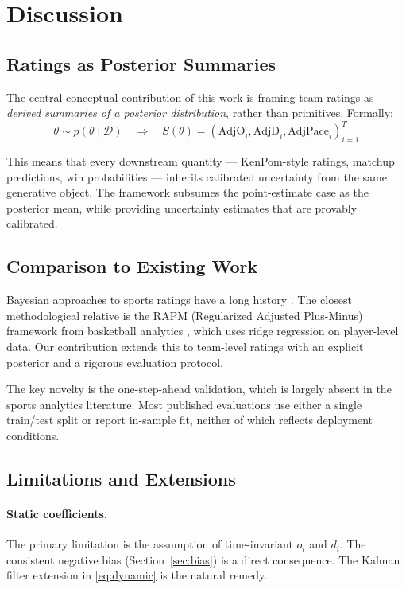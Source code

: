 \documentclass[11pt]{article}
\begin{document}
\section{Discussion}

\subsection{Ratings as Posterior Summaries}

The central conceptual contribution of this work is framing team ratings as
\emph{derived summaries of a posterior distribution}, rather than primitives.
Formally:
\begin{equation}
  \theta \sim p(\theta \mid \mathcal{D})
  \quad\Longrightarrow\quad
  S(\theta) = (\text{AdjO}_i, \text{AdjD}_i, \text{AdjPace}_i)_{i=1}^T
\end{equation}

This means that every downstream quantity --- KenPom-style ratings, matchup
predictions, win probabilities --- inherits calibrated uncertainty from the same
generative object.  The framework subsumes the point-estimate case as the
posterior mean, while providing uncertainty estimates that are provably
calibrated.

\subsection{Comparison to Existing Work}

Bayesian approaches to sports ratings have a long history
\citep{glickman1999,kovalchik2016}.  The closest methodological relative is the
RAPM (Regularized Adjusted Plus-Minus) framework from basketball analytics
\citep{sill2010}, which uses ridge regression on player-level data.  Our
contribution extends this to team-level ratings with an explicit posterior and
a rigorous evaluation protocol.

The key novelty is the one-step-ahead validation, which is largely absent in
the sports analytics literature.  Most published evaluations use either a
single train/test split or report in-sample fit, neither of which reflects
deployment conditions.

\subsection{Limitations and Extensions}

\paragraph{Static coefficients.}  The primary limitation is the assumption of
time-invariant $o_i$ and $d_i$.  The consistent negative bias (Section~\ref{sec:bias}) is a direct consequence.  The Kalman filter extension in \eqref{eq:dynamic} is the natural remedy.
\end{document}
